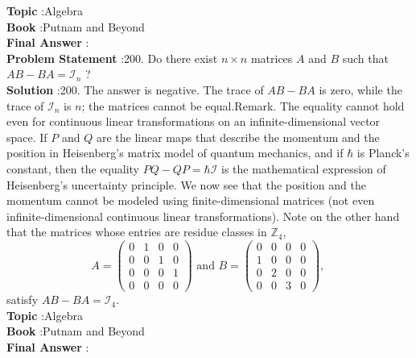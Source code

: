 \documentclass[10pt]{article}
\begin{document}
\textbf{Topic} :Algebra\\
\textbf{Book} :Putnam and Beyond\\
\textbf{Final Answer} :\\


\textbf{Problem Statement} :200. Do there exist $n \times n$ matrices $A$ and $B$ such that $A B-B A=\mathcal{I}_{n}$ ?\\
\textbf{Solution} :200. The answer is negative. The trace of $A B-B A$ is zero, while the trace of $\mathcal{I}_{n}$ is $n$; the matrices cannot be equal.Remark. The equality cannot hold even for continuous linear transformations on an infinite-dimensional vector space. If $P$ and $Q$ are the linear maps that describe the momentum and the position in Heisenberg's matrix model of quantum mechanics, and if $\hbar$ is Planck's constant, then the equality $P Q-Q P=\hbar \mathcal{I}$ is the mathematical expression of Heisenberg's uncertainty principle. We now see that the position and the momentum cannot be modeled using finite-dimensional matrices (not even infinite-dimensional continuous linear transformations). Note on the other hand that the matrices whose entries are residue classes in $\mathbb{Z}_{4}$,$$ A=\left(\begin{array}{llll} 0 & 1 & 0 & 0 \\ 0 & 0 & 1 & 0 \\ 0 & 0 & 0 & 1 \\ 0 & 0 & 0 & 0 \end{array}\right) \text { and } B=\left(\begin{array}{llll} 0 & 0 & 0 & 0 \\ 1 & 0 & 0 & 0 \\ 0 & 2 & 0 & 0 \\ 0 & 0 & 3 & 0 \end{array}\right) \text {, } $$satisfy $A B-B A=\mathcal{I}_{4}$.\\
\textbf{Topic} :Algebra\\
\textbf{Book} :Putnam and Beyond\\
\textbf{Final Answer} :\\
\end{document}
